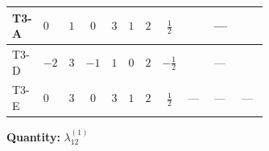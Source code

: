 \documentclass[8pt]{article}
\begin{document}
\begin{landscape}
\begin{longtable}{@{}llcccccc >{\raggedright\arraybackslash}p{0.21\linewidth} >{\raggedright\arraybackslash}p{0.21\linewidth} >{\raggedright\arraybackslash}p{0.21\linewidth}@{}}
\midrule
T3-A & $0$ & $1$ & $0$ & $3$ & $1$ & $2$ & $\frac{1}{2}$ & \scriptsize\adjustbox{max width=\linewidth}{$\begin{gathered} 4 {\lambda_5} \left({\lambda_5}\right)^{*}\end{gathered}$} & --- & \scriptsize\adjustbox{max width=\linewidth}{$\begin{gathered} -12 {g_2}^2 {\lambda_{12}^{(1)}}\end{gathered}$} \\
\midrule
T3-D & $-2$ & $3$ & $-1$ & $1$ & $0$ & $2$ & $-\frac{1}{2}$ & \scriptsize\adjustbox{max width=\linewidth}{$\begin{gathered} 4 {\lambda_5} \left({\lambda_5}\right)^{*}\end{gathered}$} & --- & \scriptsize\adjustbox{max width=\linewidth}{$\begin{gathered} -12 {g_2}^2 {\lambda_{12}^{(1)}}\end{gathered}$} \\
\midrule
T3-E & $0$ & $3$ & $0$ & $3$ & $1$ & $2$ & $\frac{1}{2}$ & --- & --- & --- \\
\midrule
\bottomrule
\end{longtable}
\clearpage
\noindent\textbf{Quantity: }$\lambda_{12}^{(1)}$\par\smallskip

\end{landscape}
\end{document}
